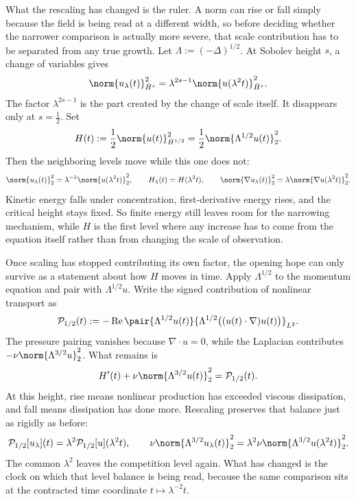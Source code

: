 What the rescaling has changed is the ruler. A norm can rise or fall simply because the field is being read at a different width, so before deciding whether the narrower comparison is actually more severe, that scale contribution has to be separated from any true growth. Let \(\Lambda:=(-\Delta)^{1/2}\). At Sobolev height \(s\), a change of variables gives
\[
  \norm{u_\lambda(t)}_{\dot H^s}^2
  =
  \lambda^{2s-1}
  \norm{u(\lambda^2t)}_{\dot H^s}^2.
\]
The factor \(\lambda^{2s-1}\) is the part created by the change of scale itself. It disappears only at \(s=\tfrac12\). Set
\[
  H(t)
  :=
  \frac12\norm{u(t)}_{\dot H^{1/2}}^2
  =
  \frac12\norm{\Lambda^{1/2}u(t)}_2^2.
\]
Then the neighboring levels move while this one does not:
\[
  \norm{u_\lambda(t)}_2^2
  =
  \lambda^{-1}\norm{u(\lambda^2t)}_2^2,
  \qquad
  H_\lambda(t)=H(\lambda^2t),
  \qquad
  \norm{\nabla u_\lambda(t)}_2^2
  =
  \lambda\norm{\nabla u(\lambda^2t)}_2^2.
\]
Kinetic energy falls under concentration, first-derivative energy rises, and the critical height stays fixed. So finite energy still leaves room for the narrowing mechanism, while \(H\) is the first level where any increase has to come from the equation itself rather than from changing the scale of observation.


Once scaling has stopped contributing its own factor, the opening hope can only survive as a statement about how \(H\) moves in time. Apply \(\Lambda^{1/2}\) to the momentum equation and pair with \(\Lambda^{1/2}u\). Write the signed contribution of nonlinear transport as
\[
  \mathcal P_{1/2}(t)
  :=
  -\operatorname{Re}
  \pair
    {\Lambda^{1/2}u(t)}
    {\Lambda^{1/2}\bigl((u(t)\cdot\nabla)u(t)\bigr)}_{L^2}.
\]
The pressure pairing vanishes because \(\nabla\cdot u=0\), while the Laplacian contributes \(-\nu\norm{\Lambda^{3/2}u}_2^2\). What remains is
\[
  H'(t)
  +
  \nu\norm{\Lambda^{3/2}u(t)}_2^2
  =
  \mathcal P_{1/2}(t).
\]
At this height, rise means nonlinear production has exceeded viscous dissipation, and fall means dissipation has done more. Rescaling preserves that balance just as rigidly as before:
\[
  \mathcal P_{1/2}[u_\lambda](t)
  =
  \lambda^2\mathcal P_{1/2}[u](\lambda^2t),
  \qquad
  \nu\norm{\Lambda^{3/2}u_\lambda(t)}_2^2
  =
  \lambda^2\nu\norm{\Lambda^{3/2}u(\lambda^2t)}_2^2.
\]
The common \(\lambda^2\) leaves the competition level again. What has changed is the clock on which that level balance is being read, because the same comparison sits at the contracted time coordinate \(t\mapsto\lambda^{-2}t\).

